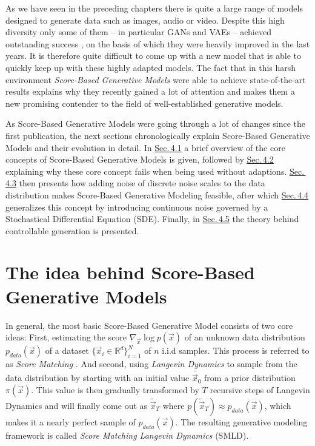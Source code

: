 As we have seen in the preceding chapters there is quite a large range of models designed to generate data such as images, audio or video. Despite this high diversity only some of them – in particular GANs and VAEs – achieved outstanding success \cite{biggan, vqvae2}, on the basis of which they were heavily improved in the last years. It is therefore quite difficult to come up with a new model that is able to quickly keep up with these highly adapted models. The fact that in this harsh environment \textit{Score-Based Generative Models} \cite{score_1, score_3, score_2} were able to achieve state-of-the-art results explains why they recently gained a lot of attention and makes them a new promising contender to the field of well-established generative models.

As Score-Based Generative Models were going through a lot of changes since the first publication, the next sections chronologically explain Score-Based Generative Models and their evolution in detail. In \hyperref[sec:4.1]{Sec.\,4.1} a brief overview of the core concepts of Score-Based Generative Models is given, followed by \hyperref[sec:4.2]{Sec.\,4.2} explaining why these core concept fails when being used without adaptions. \hyperref[sec:4.3]{Sec.\,4.3} then presents how adding noise of discrete noise scales to the data distribution makes Score-Based Generative Modeling feasible, after which \hyperref[sec:4.4]{Sec.\,4.4} generalizes this concept by introducing continuous noise governed by a Stochastical Differential Equation (SDE). Finally, in \hyperref[sec:4.5]{Sec.\,4.5} the theory behind controllable generation is presented.

\section{The idea behind Score-Based Generative Models} \label{sec:4.1}
In general, the most basic Score-Based Generative Model consists of two core ideas: First, estimating the score $\nabla_{\vec{x}}\log p(\vec{x})$ of an unknown data distribution $p_{data}(\vec{x})$ of a dataset $\{\vec{x}_i\in \mathbb{R}^d\}_{i=1}^N$ of $n$ i.i.d samples. This process is referred to as \textit{Score Matching} \cite{score_matching_original}. And second, using \textit{Langevin Dynamics} \cite{langevin1, langevin2} to sample from the data distribution by starting with an initial value $\tilde{\vec{x}_0}$ from a prior distribution $\pi(\vec{x})$. This value is then gradually transformed by $T$ recursive steps of Langevin Dynamics and will finally come out as $\tilde{\vec{x}}_T$ where $p(\tilde{\vec{x}}_T)\approx p_{data}(\vec{x})$, which makes it a nearly perfect sample of $p_{data}(\vec{x})$. The resulting generative modeling framework is called \textit{Score Matching Langevin Dynamics} (SMLD).
%
